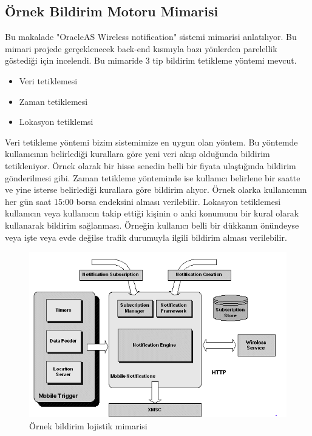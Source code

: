 \subsection{Örnek Bildirim Motoru Mimarisi}
Bu makalade "OracleAS Wireless notification" sistemi mimarisi anlatılıyor. Bu mimari projede gerçeklenecek back-end kısmıyla bazı yönlerden parelellik göstediği için incelendi.
\noindent
Bu mimaride 3 tip bildirim tetikleme yöntemi mevcut.
\begin{itemize}
  \item Veri tetiklemesi
  \item Zaman tetiklemesi
  \item Lokasyon tetiklemsi
\end{itemize}
Veri tetikleme yöntemi bizim sistemimize en uygun olan yöntem. Bu yöntemde kullanıcının belirlediği kurallara göre yeni veri akışı olduğunda bildirim tetikleniyor. Örnek olarak bir hisse senedin belli bir fiyata ulaştığında bildirim gönderilmesi gibi.
\newline
\newline
\noindent
Zaman tetikleme yönteminde ise kullanıcı belirlene bir saatte ve yine isterse belirlediği kurallara göre bildirim alıyor. Örnek olarka kullanıcının her gün saat 15:00 borsa endeksini alması verilebilir.
\newline
\newline
\noindent
Lokasyon tetiklemesi kullanıcın veya kullanıcın takip ettiği kişinin o anki konumunu bir kural olarak kullanarak bildirim sağlanması. Örneğin kullanıcı belli bir dükkanın önündeyse veya işte veya evde değilse trafik durumuyla ilgili bildirim alması verilebilir.
\clearpage
\begin{figure}
    \centering
    \includegraphics[width=\textwidth]{Report/images/notif.png}
    \caption{Örnek bildirim lojistik mimarisi\cite{notif}}
    \label{fig:mesh2}
\end{figure}
\clearpage
